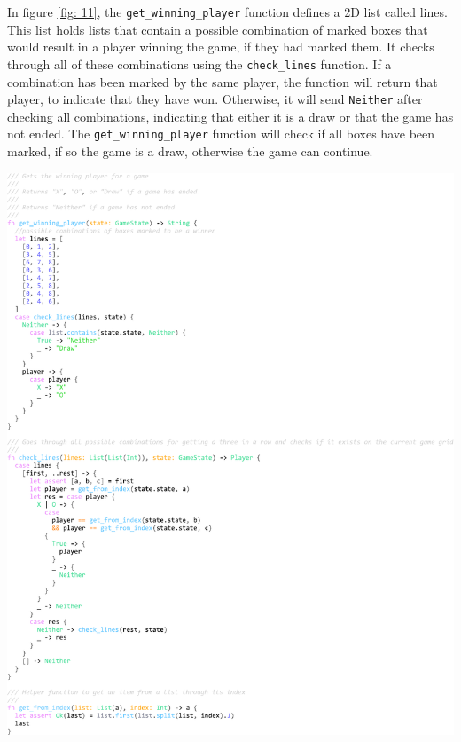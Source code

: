 \documentclass[]{final}
\begin{document}
\newpage

\begin{minipage}[t]{18em}
  In figure \ref{fig: 11}, the \lstinline|get_winning_player| function defines a
  2D list called lines. This list holds lists that contain a possible combination
  of marked boxes that would result in a player winning the game, if they had marked them.
  It checks through all of these combinations using the \lstinline|check_lines| function.
  If a combination has been marked by the same player, the function will return that player,
  to indicate that they have won. Otherwise, it will send \lstinline|Neither| after checking all
  combinations, indicating that either it is a draw or that the game has not ended.
  The \lstinline|get_winning_player| function will check if all boxes have been marked,
  if so the game is a draw, otherwise the game can continue.
\end{minipage}
\hfill
\begin{minipage}[t]{20em}
  \includegraphics[width=\textwidth]{winning.pdf}
  \label{fig: 13}
\end{minipage}
\end{document}
